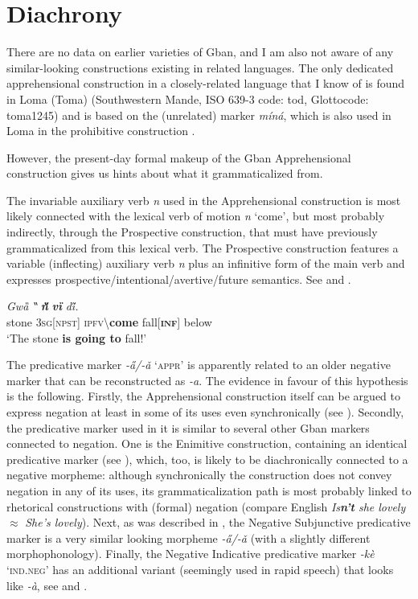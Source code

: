 \documentclass[output=paper,colorlinks,citecolor=brown
]{langscibook}
\begin{document}
\section{Diachrony}
\label{sec:fedotov:diachrony}

There are no data on earlier varieties of Gban, and I am also not aware of any similar-looking constructions existing in related languages. The only dedicated apprehensional construction in a closely-related language that I know of is found in Loma (Toma) (Southwestern Mande, ISO 639-3 code: tod, Glottocode: toma1245) and is based on the (unrelated) marker \textit{míná}, which is also used in Loma in the prohibitive construction \parencite[378, 379]{mishchenko2017}.

However, the present-day formal makeup of the Gban Apprehensional construction gives us hints about what it grammaticalized from.

The invariable auxiliary verb \textit{n{\ù}} used in the Apprehensional construction is most likely connected with the lexical verb of motion \textit{n{\ù}} `come', but most probably indirectly, through the Prospective construction, that must have previously grammaticalized from this lexical verb. The Prospective construction features a variable (inflecting) auxiliary verb \textit{n{\ù}} plus an infinitive form of the main verb and expresses prospective\slash intentional\slash avertive\slash future semantics. See  and .


\ea \label{ex:Fed67}
\gll \textit{Gwȁ} \textit{‶} \textit{\textbf{n{\ȕ}}} \textit{\textbf{vȉ}} \textit{di̋.} \\
stone \textsc{3sg[npst]} \textsc{ipfv\backslash}\textbf{come} fall\textsc{[\textbf{inf}]} below \\
 `The stone \textbf{is going to} fall!'
\z

 The predicative marker \textit{-a̋/-ǎ} `\textsc{appr}' is apparently related to an older negative marker that can be reconstructed as \textit{\text{*}-a}. The evidence in favour of this hypothesis is the following. Firstly, the Apprehensional construction itself can be argued to express negation at least in some of its uses even synchronically (see ). Secondly, the predicative marker used in it is similar to several other Gban markers connected to negation. One is the Enimitive construction, containing an identical predicative marker (see ), which, too, is likely to be diachronically connected to a negative morpheme: although synchronically the construction does not convey negation in any of its uses, its grammaticalization path is most probably linked to rhetorical constructions with (formal) negation (compare English \textit{Is\textbf{n't} she lovely} $\approx$ \textit{She's lovely}). Next, as was described in , the Negative Subjunctive predicative marker is a very similar looking morpheme \textit{-a̋/-ǎ} (with a slightly different morphophonology). Finally, the Negative Indicative predicative marker \textit{-kè} `\textsc{ind.neg}' has an additional variant (seemingly used in rapid speech) that looks like \textit{-à}, see  and .
\end{document}

